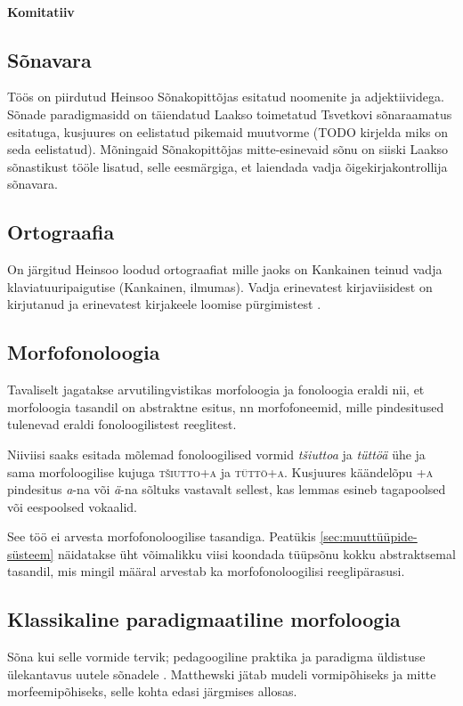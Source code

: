 \documentclass[12pt,a4paper]{article}
\begin{document}
\paragraph*{Komitatiiv}

\subsection{Sõnavara}
\label{sec:sõnavara}
Töös on piirdutud Heinsoo Sõnakopittõjas esitatud noomenite ja adjektiividega. Sõnade paradigmasidd on täiendatud Laakso toimetatud Tsvetkovi sõnaraamatus esitatuga, kusjuures on eelistatud pikemaid muutvorme (TODO kirjelda miks on seda eelistatud). Mõningaid Sõnakopittõjas mitte-esinevaid sõnu on siiski Laakso sõnastikust tööle lisatud, selle eesmärgiga, et laiendada vadja õigekirjakontrollija sõnavara.


\subsection{Ortograafia}
\label{sec:ortograafia}

On järgitud Heinsoo loodud ortograafiat mille jaoks on Kankainen teinud vadja klaviatuuripaigutise (Kankainen, ilmumas). Vadja erinevatest kirjaviisidest on kirjutanud \cite{ernits_vadja_2010} ja erinevatest kirjakeele loomise pürgimistest \cite{ernits_vadja_2006}.


\subsection{Morfofonoloogia}
Tavaliselt jagatakse arvutilingvistikas morfoloogia ja fonoloogia eraldi nii, et morfoloogia tasandil on abstraktne esitus, nn morfofoneemid, mille pindesitused tulenevad eraldi fonoloogilistest reeglitest.

Niiviisi saaks esitada mõlemad fonoloogilised vormid \textit{tšiuttoa} ja \textit{tüttöä} ühe ja sama morfoloogilise kujuga \textsc{tšiutto+a} ja \textsc{tüttö+a}. Kusjuures käändelõpu \textsc{+a} pindesitus \textit{a}-na või \textit{ä}-na sõltuks vastavalt sellest, kas lemmas esineb tagapoolsed või eespoolsed vokaalid.

See töö ei arvesta morfofonoloogilise tasandiga. Peatükis \ref{sec:muuttüüpide-süsteem} näidatakse üht võimalikku viisi koondada tüüpsõnu kokku abstraktsemal tasandil, mis mingil määral arvestab ka morfofonoloogilisi reeglipärasusi.


\subsection{Klassikaline paradigmaatiline morfoloogia}
Sõna kui selle vormide tervik; pedagoogiline praktika ja paradigma üldistuse ülekantavus uutele sõnadele \cite{matthews_morphology_1991}. Matthewski jätab mudeli vormipõhiseks ja mitte morfeemipõhiseks, selle kohta edasi järgmises allosas.
\end{document}

